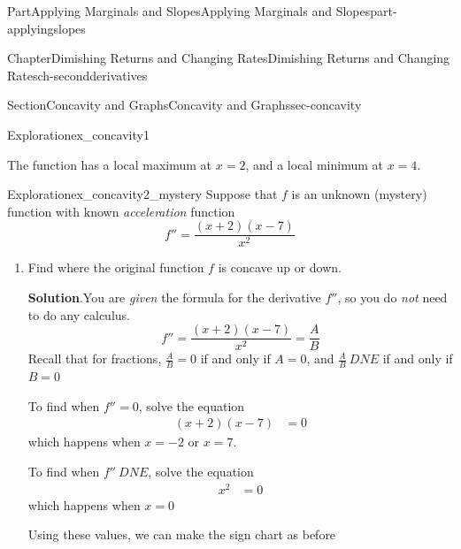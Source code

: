 \documentclass[oneside,10pt,]{tufte-book}
\newcommand{\blocktitlefont}{\relax}
\numberwithin{equation}{chapter}
\newcommand{\amp}{&}
\begin{document}
\begin{partptx}{Part}{Applying Marginals and Slopes}{}{Applying Marginals and Slopes}{}{}{part-applyingslopes}
\begin{chapterptx}{Chapter}{Dimishing Returns and Changing Rates}{}{Dimishing Returns and Changing Rates}{}{}{ch-secondderivatives}
\begin{sectionptx}{Section}{Concavity and Graphs}{}{Concavity and Graphs}{}{}{sec-concavity}
\begin{exploration}{Exploration}{}{ex_concavity1}
\begin{enumerate}[font=\bfseries,label=(\alph*),ref=\alph*]
\begin{image}{0.25}{0.5}{0.25}{}
{
}%
\end{image}%
 The function has a local maximum at \(x=2\), and a local minimum at \(x=4\).%
\end{enumerate}%
\end{exploration}%
\begin{exploration}{Exploration}{}{ex_concavity2_mystery}%
Suppose that \(f\) is an unknown (mystery) function with known \emph{acceleration} function%
\begin{equation*}
f'' = \dfrac{(x+2)(x-7)}{x^2}
\end{equation*}
%
\begin{enumerate}[font=\bfseries,label=(\alph*),ref=\alph*]%
\item{}Find where the original function \(f\) is concave up or down.%
\par\smallskip%
\noindent\textbf{\blocktitlefont Solution}.\hypertarget{ex_concavity2_mystery-2-2}{}\quad{}You are \emph{given} the formula for the derivative \(f''\), so you do \emph{not} need to do any calculus.%
\begin{equation*}
f'' = \dfrac{(x+2)(x-7)}{x^2} = \dfrac{A}{B}
\end{equation*}
Recall that for fractions, \(\frac{A}{B}=0\) if and only if \(A=0\), and \(\frac{A}{B}\ DNE\) if and only if \(B=0\)%
\par
To find when \(f''=0\), solve the equation%
\begin{align*}
(x+2)(x-7) \amp = 0 
\end{align*}
which happens when \(x=-2\) or \(x=7\).%
\par
To find when \(f''\ DNE\), solve the equation%
\begin{align*}
x^2 \amp =0
\end{align*}
which happens when \(x=0\)%
\par
Using these values, we can make the sign chart as before \begin{image}{0.125}{0.75}{0.125}{}%
\resizebox{\linewidth}{!}{%
}
\end{image}
\end{enumerate}
\end{exploration}
\end{sectionptx}
\end{chapterptx}
\end{partptx}
\end{document}
